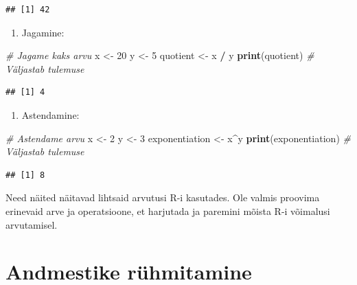 \documentclass[
]{book}
\newenvironment{Shaded}{\begin{snugshade}}{\end{snugshade}}
\newcommand{\CommentTok}[1]{\textcolor[rgb]{0.56,0.35,0.01}{\textit{#1}}}
\newcommand{\DecValTok}[1]{\textcolor[rgb]{0.00,0.00,0.81}{#1}}
\newcommand{\FunctionTok}[1]{\textcolor[rgb]{0.13,0.29,0.53}{\textbf{#1}}}
\newcommand{\NormalTok}[1]{#1}
\newcommand{\OtherTok}[1]{\textcolor[rgb]{0.56,0.35,0.01}{#1}}
\newcommand{\SpecialCharTok}[1]{\textcolor[rgb]{0.81,0.36,0.00}{\textbf{#1}}}
\providecommand{\tightlist}{%
  \setlength{\itemsep}{0pt}\setlength{\parskip}{0pt}}
\renewenvironment{Shaded} {\begin{snugshade}\footnotesize} {\end{snugshade}}
\begin{document}
\begin{verbatim}
## [1] 42
\end{verbatim}

\begin{enumerate}
\def\labelenumi{\arabic{enumi}.}
\setcounter{enumi}{3}
\tightlist
\item
  Jagamine:
\end{enumerate}

\begin{Shaded}
\begin{Highlighting}[]
\CommentTok{\# Jagame kaks arvu}
\NormalTok{x }\OtherTok{\textless{}{-}} \DecValTok{20}
\NormalTok{y }\OtherTok{\textless{}{-}} \DecValTok{5}
\NormalTok{quotient }\OtherTok{\textless{}{-}}\NormalTok{ x }\SpecialCharTok{/}\NormalTok{ y}
\FunctionTok{print}\NormalTok{(quotient) }\CommentTok{\# Väljastab tulemuse}
\end{Highlighting}
\end{Shaded}

\begin{verbatim}
## [1] 4
\end{verbatim}

\begin{enumerate}
\def\labelenumi{\arabic{enumi}.}
\setcounter{enumi}{4}
\tightlist
\item
  Astendamine:
\end{enumerate}

\begin{Shaded}
\begin{Highlighting}[]
\CommentTok{\# Astendame arvu}
\NormalTok{x }\OtherTok{\textless{}{-}} \DecValTok{2}
\NormalTok{y }\OtherTok{\textless{}{-}} \DecValTok{3}
\NormalTok{exponentiation }\OtherTok{\textless{}{-}}\NormalTok{ x}\SpecialCharTok{\^{}}\NormalTok{y}
\FunctionTok{print}\NormalTok{(exponentiation) }\CommentTok{\# Väljastab tulemuse}
\end{Highlighting}
\end{Shaded}

\begin{verbatim}
## [1] 8
\end{verbatim}

Need näited näitavad lihtsaid arvutusi R-i kasutades. Ole valmis proovima erinevaid arve ja operatsioone, et harjutada ja paremini mõista R-i võimalusi arvutamisel.

\chapter{Andmestike rühmitamine}\label{andmestike-ruxfchmitamine}
\end{document}

